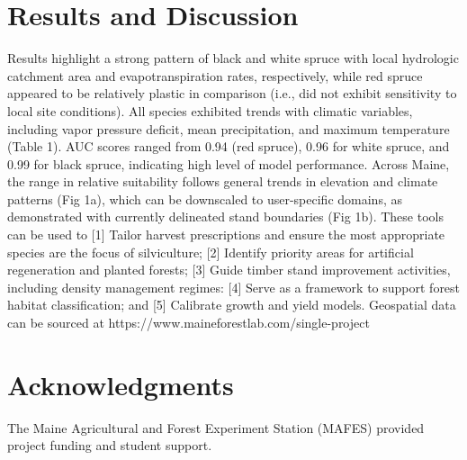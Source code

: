\documentclass[9pt, twocolumn]{article}
\begin{document}
\section{Results and Discussion}
Results highlight a strong pattern of black and white spruce with local hydrologic catchment area and evapotranspiration rates, respectively, while red spruce appeared to be relatively plastic in comparison (i.e., did not exhibit sensitivity to local site conditions). All species exhibited trends with climatic variables, including vapor pressure deficit, mean precipitation, and maximum temperature (Table 1). AUC scores ranged from 0.94 (red spruce), 0.96 for white spruce, and 0.99 for black spruce, indicating high level of model performance. Across Maine, the range in relative suitability follows general trends in elevation and climate patterns (Fig 1a), which can be downscaled to user-specific domains, as demonstrated with currently delineated stand boundaries (Fig 1b). These tools can be used to [1] Tailor harvest prescriptions and ensure the most appropriate species are the focus of silviculture; [2] Identify priority areas for artificial regeneration and planted forests; [3] Guide timber stand improvement activities, including density management regimes: [4] Serve as a framework to support forest habitat classification; and [5] Calibrate growth and yield models. Geospatial data can be sourced at https://www.maineforestlab.com/single-project
\section{Acknowledgments}
The Maine Agricultural and Forest Experiment Station (MAFES) provided project funding and student support.  

\onecolumn
\end{document}
